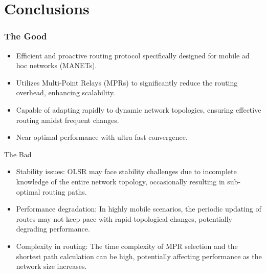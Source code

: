 \documentclass[11pt]{beamer}              %
\begin{document}
\section{Conclusions}
\begin{frame}
\frametitle{The Good}
\begin{itemize}
    \item Efficient and proactive routing protocol specifically designed for mobile ad hoc networks (MANETs).
    \item Utilizes Multi-Point Relays (MPRs) to significantly reduce the routing overhead, enhancing scalability.
    \item Capable of adapting rapidly to dynamic network topologies, ensuring effective routing amidst frequent changes.
    \item Near optimal performance with ultra fast convergence.
\end{itemize}
\end{frame}

\begin{frame}{The Bad}

\begin{itemize}
    \item Stability issues: OLSR may face stability challenges due to incomplete knowledge of the entire network topology, occasionally resulting in sub-optimal routing paths.
    \item Performance degradation: In highly mobile scenarios, the periodic updating of routes may not keep pace with rapid topological changes, potentially degrading performance.
    \item Complexity in routing: The time complexity of MPR selection and the shortest path calculation can be high, potentially affecting performance as the network size increases.
\end{itemize}
    
\end{frame}



\end{document}
